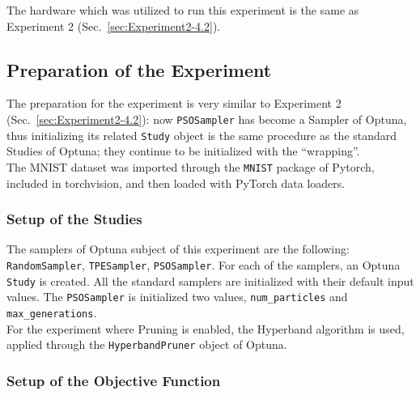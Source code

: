 The hardware which was utilized to run this experiment is the same as Experiment 2 (Sec.~\ref{sec:Experiment2-4.2}).

\subsection{Preparation of the Experiment}

The preparation for the experiment is very similar to Experiment 2 (Sec.~\ref{sec:Experiment2-4.2}): now \texttt{PSOSampler} has become a Sampler of Optuna, thus initializing its related \texttt{Study} object is the same procedure as the standard Studies of Optuna; they continue to be initialized with the “wrapping”.
\\[0.3cm]The MNIST dataset was imported through the \texttt{MNIST} package of Pytorch, included in torchvision, and then loaded with PyTorch data loaders.

\subsubsection{Setup of the Studies}

The samplers of Optuna subject of this experiment are the following: \texttt{RandomSampler}, \texttt{TPESampler}, \texttt{PSOSampler}.
For each of the samplers, an Optuna \texttt{Study} is created. All the standard samplers are initialized with their default input values. The \texttt{PSOSampler} is initialized two values, \texttt{num\_particles} and \texttt{max\_generations}.
\\[0.3cm]For the experiment where Pruning is enabled, the Hyperband algorithm is used, applied through the \texttt{HyperbandPruner} object of Optuna.

\subsubsection{Setup of the Objective Function}

